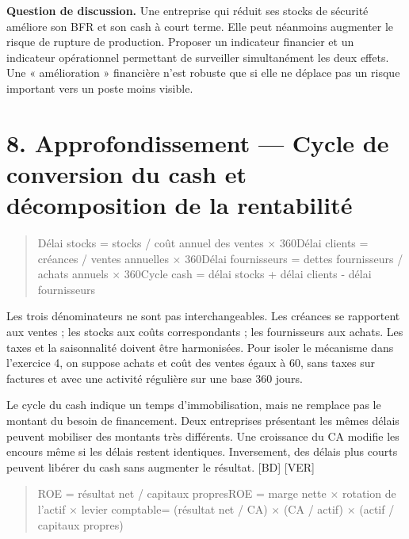 \documentclass[12pt,a4paper]{article}
\begin{document}
\textbf{Question de discussion.} Une entreprise qui réduit ses stocks de sécurité améliore son BFR et son cash à court terme. Elle peut néanmoins augmenter le risque de rupture de production. Proposer un indicateur financier et un indicateur opérationnel permettant de surveiller simultanément les deux effets. Une « amélioration » financière n’est robuste que si elle ne déplace pas un risque important vers un poste moins visible.

\section*{8. Approfondissement --- Cycle de conversion du cash et décomposition de la rentabilité}

\begin{quote}\small Délai stocks = stocks / coût annuel des ventes $\times$ 360\newline Délai clients = créances / ventes annuelles $\times$ 360\newline Délai fournisseurs = dettes fournisseurs / achats annuels $\times$ 360\newline Cycle cash = délai stocks + délai clients - délai fournisseurs\end{quote}

Les trois dénominateurs ne sont pas interchangeables. Les créances se rapportent aux ventes ; les stocks aux coûts correspondants ; les fournisseurs aux achats. Les taxes et la saisonnalité doivent être harmonisées. Pour isoler le mécanisme dans l’exercice 4, on suppose achats et coût des ventes égaux à 60, sans taxes sur factures et avec une activité régulière sur une base 360 jours.


Le cycle du cash indique un temps d’immobilisation, mais ne remplace pas le montant du besoin de financement. Deux entreprises présentant les mêmes délais peuvent mobiliser des montants très différents. Une croissance du CA modifie les encours même si les délais restent identiques. Inversement, des délais plus courts peuvent libérer du cash sans augmenter le résultat. [BD] [VER]



\begin{quote}\small ROE = résultat net / capitaux propres\newline ROE = marge nette $\times$ rotation de l’actif $\times$ levier comptable\newline = (résultat net / CA) $\times$ (CA / actif) $\times$ (actif / capitaux propres)\end{quote}
\end{document}
